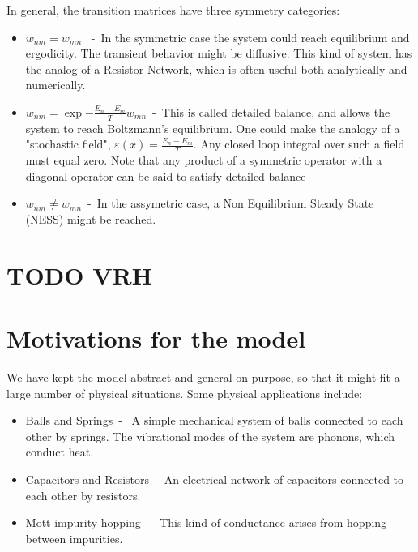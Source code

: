 In general, the transition matrices have three symmetry categories:
\begin{itemize}
  \item 
    $w_{nm} = w_{mn}$ \ -\ In the symmetric case the system could reach
      equilibrium and ergodicity. The transient behavior might be diffusive. 
      This kind of system has the analog of a Resistor Network, which is often
      useful both analytically and numerically.
  \item
    $w_{nm} = \exp{-\frac{E_n-E_m}{T}} w_{mn}$\ -\ This is called detailed balance,
      and allows the system to reach Boltzmann's equilibrium. One could make
      the analogy of a "stochastic field", $\varepsilon(x) = \frac{E_n-E_m}{T}$.
      Any closed loop integral over such a field must equal zero.
      Note that any product of a symmetric operator with a diagonal operator
      can be said to satisfy detailed balance \cite{kolmogoroff_zur_1936}
  \item
    $w_{nm} \ne w_{mn}$\ -\ In the assymetric case, a Non Equilibrium Steady
      State (NESS) might be reached. 
\end{itemize}

\section{TODO VRH}

\section{Motivations for the model}

We have kept the model abstract and general on purpose, so that it
might fit a large number of physical situations. Some physical applications include:
%
\begin{itemize}
  \item
    Balls and Springs\ - \ A simple mechanical system of balls connected to each
      other by springs. The vibrational modes of the system are phonons, which conduct heat.
  \item
    Capacitors and Resistors\ -\ An electrical network of capacitors connected to each other
      by resistors.
  \item 
    Mott impurity hopping\ - \ This kind of conductance arises from hopping 
      between impurities.
\end{itemize}


